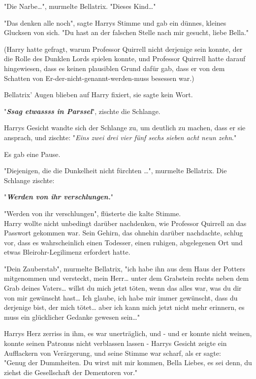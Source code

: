 {"Die Narbe…", murmelte Bellatrix. "Dieses Kind…"

"Das denken alle noch", sagte Harrys Stimme und gab ein dünnes, kleines Glucksen von sich. "Du hast an der falschen Stelle nach mir gesucht, liebe Bella."

(Harry hatte gefragt, warum Professor Quirrell nicht derjenige sein konnte, der die Rolle des Dunklen Lords spielen konnte, und Professor Quirrell hatte darauf hingewiesen, dass es keinen plausiblen Grund dafür gab, dass er von dem Schatten von Er-der-nicht-genannt-werden-muss besessen war.)

Bellatrix' Augen blieben auf Harry fixiert, sie sagte kein Wort.

"\textbf{\emph{Ssag etwassss in Parssel}}", zischte die Schlange.

Harrys Gesicht wandte sich der Schlange zu, um deutlich zu machen, dass er sie ansprach, und zischte: "\emph{Eins zwei drei vier fünf sechs sieben acht neun zehn}."

Es gab eine Pause.

"Diejenigen, die die Dunkelheit nicht fürchten …", murmelte Bellatrix. Die Schlange zischte:

"\textbf{\emph{Werden von ihr verschlungen.}}"

"Werden von ihr verschlungen", flüsterte die kalte Stimme.\\ Harry wollte nicht unbedingt darüber nachdenken, wie Professor Quirrell an das Passwort gekommen war. Sein Gehirn, das ohnehin darüber nachdachte, schlug vor, dass es wahrscheinlich einen Todesser, einen ruhigen, abgelegenen Ort und etwas Bleirohr-Legilimenz erfordert hatte.

"Dein Zauberstab", murmelte Bellatrix, "ich habe ihn aus dem Haus der Potters mitgenommen und versteckt, mein Herr… unter dem Grabstein rechts neben dem Grab deines Vaters… willst du mich jetzt töten, wenn das alles war, was du dir von mir gewünscht hast… Ich glaube, ich habe mir immer gewünscht, dass du derjenige bist, der mich tötet… aber ich kann mich jetzt nicht mehr erinnern, es muss ein glücklicher Gedanke gewesen sein…"

Harrys Herz zerriss in ihm, es war unerträglich, und - und er konnte nicht weinen, konnte seinen Patronus nicht verblassen lassen - Harrys Gesicht zeigte ein Aufflackern von Verärgerung, und seine Stimme war scharf, als er sagte:\\ "Genug der Dummheiten. Du wirst mit mir kommen, Bella Liebes, es sei denn, du ziehst die Gesellschaft der Dementoren vor."

}

